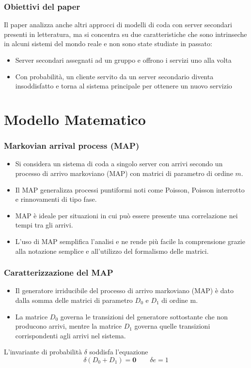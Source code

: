 \documentclass{beamer}
\begin{document}
\begin{frame}
    \frametitle{Obiettivi del paper}
    Il paper analizza anche altri approcci di modelli di coda con server secondari presenti in letteratura, ma si concentra su due caratteristiche che sono intrinseche in alcuni sistemi del mondo reale e non sono state studiate in passato:
    \begin{block}{}
    \begin{itemize}
        \item Server secondari assegnati ad un gruppo e offrono i servizi uno alla volta
        \item Con probabilità, un cliente servito da un server secondario diventa insoddisfatto e torna al sistema principale per ottenere un nuovo servizio
    \end{itemize}
    \end{block}
\end{frame}

\section{Modello Matematico}

\begin{frame}
    \frametitle{Markovian arrival process (MAP)}
    \begin{itemize}
        \item Si considera un sistema di coda a singolo server con arrivi secondo un processo di arrivo markoviano (MAP) con matrici di parametro di ordine $m$.
        \item Il MAP generalizza processi puntiformi noti come Poisson, Poisson interrotto e rinnovamenti di tipo fase.
        \item MAP è ideale per situazioni in cui può essere presente una correlazione nei tempi tra gli arrivi.
        \item L'uso di MAP semplifica l'analisi e ne rende più facile la comprensione grazie alla notazione semplice e all'utilizzo del formalismo delle matrici.
    \end{itemize}
\end{frame}

\begin{frame}
    \frametitle{Caratterizzazione del MAP}
    \begin{itemize}
        \item Il generatore irriducibile del processo di arrivo markoviano (MAP) è dato dalla somma delle matrici di parametro $D_0$ e $D_1$ di ordine m.
        \item La matrice $D_0$ governa le transizioni del generatore sottostante che non producono arrivi, mentre la matrice $D_1$ governa quelle transizioni corrispondenti agli arrivi nel sistema.
    \end{itemize}
    \begin{block}{}
        L'invariante di probabilità $\delta$ soddisfa l'equazione
        $$\delta (D_0 + D_1) = \textbf{0} \qquad \delta e = 1$$
    \end{block}
\end{frame}
\end{document}
